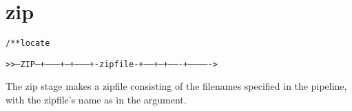\section{zip}
\begin{shaded}
\begin{alltt}
/** locate



   >>--ZIP--+---------+--+--------+-zipfile-+-----+--+-------+------------->
               

\end{alltt}
\end{shaded}
The zip stage makes a zipfile consisting of the filenames specified in
the pipeline, with the zipfile's name as in the argument.